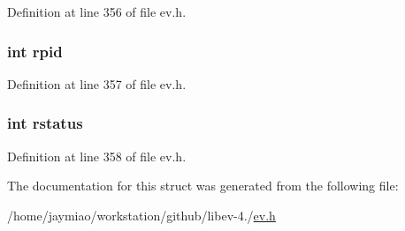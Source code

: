 \-Definition at line 356 of file ev.\-h.

\hypertarget{structev__child_afab9955a3bac28037233de894654d9e7}{
\subsubsection[{rpid}]{\setlength{\rightskip}{0pt plus 5cm}int {\bf rpid}}}\label{structev__child_afab9955a3bac28037233de894654d9e7}


\-Definition at line 357 of file ev.\-h.

\hypertarget{structev__child_ac5fa58bd2072d4433fb143a734f54c1c}{
\subsubsection[{rstatus}]{\setlength{\rightskip}{0pt plus 5cm}int {\bf rstatus}}}\label{structev__child_ac5fa58bd2072d4433fb143a734f54c1c}


\-Definition at line 358 of file ev.\-h.



\-The documentation for this struct was generated from the following file\-:\begin{DoxyCompactItemize}
\item 
/home/jaymiao/workstation/github/libev-\/4./\hyperlink{ev_8h}{ev.\-h}\end{DoxyCompactItemize}
